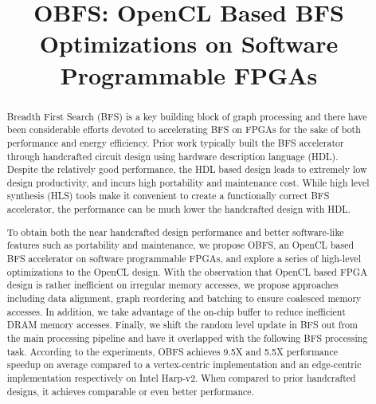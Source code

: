 \documentclass[conference]{IEEEtran}
\begin{document}
%
\title{OBFS: OpenCL Based BFS Optimizations on Software Programmable FPGAs}

\maketitle

\begin{abstract}
    Breadth First Search (BFS) is a key building block of graph processing 
	and there have been considerable efforts devoted to accelerating BFS on FPGAs
	for the sake of both performance and energy efficiency. Prior work 
	typically built the BFS accelerator through handcrafted circuit design using 
	hardware description language (HDL). Despite the relatively good performance, 
	the HDL based design leads to extremely low design productivity, and incurs 
	high portability and maintenance cost. While high level synthesis (HLS) 
	tools make it convenient to create a functionally correct BFS accelerator, 
	the performance can be much lower the handcrafted design with HDL. 

	To obtain both the near handcrafted design performance and better software-like features such as 
	portability and maintenance, we propose OBFS, an OpenCL based BFS accelerator 
	on software programmable FPGAs, and explore a series of high-level 
	optimizations to the OpenCL design. With the observation that OpenCL based 
	FPGA design is rather inefficient on irregular memory accesses, 
	we propose approaches including data alignment, graph reordering and batching
	to ensure coalesced memory accesses. In addition, we take advantage
	of the on-chip buffer to reduce inefficient DRAM memory accesses. 
	Finally, we shift the random level update in BFS out from the main processing pipeline and 
	have it overlapped with the following BFS processing task. 
	According to the experiments, OBFS achieves 9.5X and 5.5X performance speedup on average compared to a 
	vertex-centric implementation and an edge-centric implementation respectively on Intel Harp-v2. When compared to prior handcrafted designs, 
	it achieves comparable or even better performance. 
\end{abstract}
\end{document}
